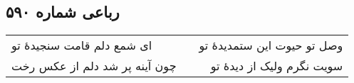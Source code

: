 \begin{center}
\section*{رباعی شماره ۵۹۰}
\label{sec:sh590}
\begin{longtable}{l p{0.5cm} r}
ای شمع دلم قامت سنجیدهٔ تو
&&
وصل تو حیوت این ستمدیدهٔ تو
\\
چون آینه پر شد دلم از عکس رخت
&&
سویت نگرم ولیک از دیدهٔ تو
\\
\end{longtable}
\end{center}
